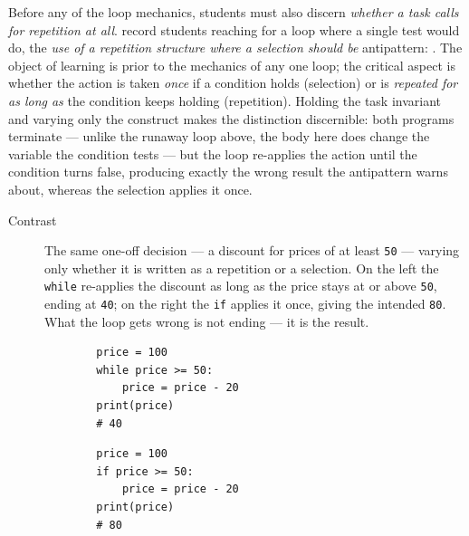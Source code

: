 Before any of the loop mechanics, students must also discern \emph{whether a task
calls for repetition at all}. \textcite{Bosse2021Antipatterns} record students
reaching for a loop where a single test would do, the \emph{use of a repetition
structure where a selection should be} antipattern:
. The object of learning is prior to the
mechanics of any one loop; the critical aspect is whether the action is taken
\emph{once} if a condition holds (selection) or is \emph{repeated for as long
as} the condition keeps holding (repetition). Holding the task invariant and
varying only the construct makes the distinction discernible: both programs
terminate --- unlike the runaway loop above, the body here does change the
variable the condition tests --- but the loop re-applies the action until the
condition turns false, producing exactly the wrong result the antipattern warns
about, whereas the selection applies it once.

\begin{description}
  \item[Contrast] The same one-off decision --- a discount for prices of at
    least \texttt{50} --- varying only whether it is written as a
    repetition or a selection. On the left the \texttt{while}
    re-applies the discount as long as the price stays at or above
    \texttt{50}, ending at \texttt{40}; on the right
    the \texttt{if} applies it once, giving the intended
    \texttt{80}. What the loop gets wrong is not ending --- it is
    the result.

    \hfill
    \begin{minipage}[t]{0.45\columnwidth}
      \begin{verbatim}
        price = 100
        while price >= 50:
            price = price - 20
        print(price)
        # 40
      \end{verbatim}
    \end{minipage}
    \hfill
    \begin{minipage}[t]{0.45\columnwidth}
      \begin{verbatim}
        price = 100
        if price >= 50:
            price = price - 20
        print(price)
        # 80
      \end{verbatim}
    \end{minipage}
\end{description}

